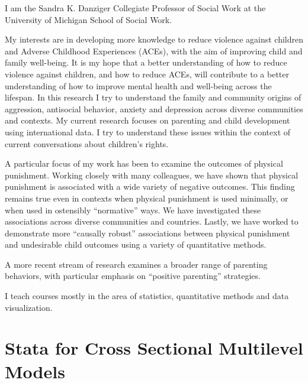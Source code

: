 \documentclass[
  letterpaper,
  DIV=11,
  numbers=noendperiod]{scrreprt}
\begin{document}
I am the Sandra K. Danziger Collegiate Professor of Social Work at the
University of Michigan School of Social Work.

My interests are in developing more knowledge to reduce violence against
children and Adverse Childhood Experiences (ACEs), with the aim of
improving child and family well-being. It is my hope that a better
understanding of how to reduce violence against children, and how to
reduce ACEs, will contribute to a better understanding of how to improve
mental health and well-being across the lifespan. In this research I try
to understand the family and community origins of aggression, antisocial
behavior, anxiety and depression across diverse communities and
contexts. My current research focuses on parenting and child development
using international data. I try to understand these issues within the
context of current conversations about children's rights.

A particular focus of my work has been to examine the outcomes of
physical punishment. Working closely with many colleagues, we have shown
that physical punishment is associated with a wide variety of negative
outcomes. This finding remains true even in contexts when physical
punishment is used minimally, or when used in ostensibly ``normative''
ways. We have investigated these associations across diverse communities
and countries. Lastly, we have worked to demonstrate more ``causally
robust'' associations between physical punishment and undesirable child
outcomes using a variety of quantitative methods.

A more recent stream of research examines a broader range of parenting
behaviors, with particular emphasis on ``positive parenting''
strategies.

I teach courses mostly in the area of statistics, quantitative methods
and data visualization.

\cleardoublepage
{}
{}
\appendix

\hypertarget{stata-for-cross-sectional-multilevel-models}{%
\chapter{Stata for Cross Sectional Multilevel
Models}\label{stata-for-cross-sectional-multilevel-models}}
\end{document}
